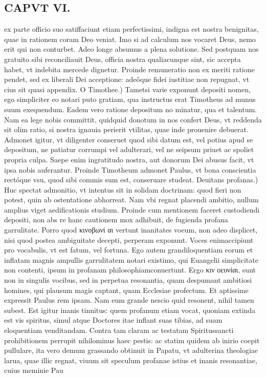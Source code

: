 \documentclass{article}
\begin{document}
\begin{pages}
\section*{CAPVT VI. }
\marginpar{[ p.85 ]}\pstart ex parte officio suo satiffaciunt etiam perfectissimi, indigna est nostra benignitas, quae in rationem coram Deo veniat. Imo si ad calculum nos vocaret Deus, nemo erit qui non conturbet. Adeo longe absumus a plena solutione. Sed postquam nos gratuito sibi reconciliauit Deus, officia nostra qualiacunque sint, sic accepta habet, vt indebita mercede dignetur. Proinde remuneratio non ex meriti ratione pendet, sed ex liberali Dei acceptione: adeôque fidei iustitiae non repugnat, vt cius sit quasi appendix.  \pend\pstart O Timothee.) Tametsi varie exponunt depositi nomen, ego simpliciter eo notari puto gratiam, qua instructus erat Timotheus ad munus suum exequendum. Eadem vero ratione depositum no minatur, qua et talentum. Nam ea lege nobis committit, quidquid donotum in nos confert Deus, vt reddenda sit olim ratio, si nostra ignauia perierit vtilitas, quae inde prouenire debuerat. Admonet igitur, vt diligenter conseruet quod sibi datum est, vel potius apud se depositum, ne patiatur corrumpi vel adulterari, vel ne seipsum priuet ac spoliet propria culpa. Saepe enim ingratitudo nostra, aut donorum Dei abusus facit, vt ipsa nobis auferantur. Proinde Timotheum admonet Paulus, vt bona conscientia rectóque vsu, quod sibi commis sum est, conseruare studeat.  \pend\pstart Deuitans profanas.) Huc spectat admonitio, vt intentus sit in solidam doctrinam: quod fieri non potest, quin ab ostentatione abhorreat. Nam vbi regnat placendi ambitio, nullum amplius viget aedificationis studium. Proinde cum mentionem faceret custodiendi depositi, non abs re hanc cautionem mox adhibuit, de fugienda profana garrulitate. Porro quod κινοβωνί αι vertunt inanitates voeum, non adeo displicet, nisi quod postea ambiguitate decepti, perperam exponunt. Voces enimaccipiunt pro vocabulis, vt est fatum, vel fortuna. Ego autem grandiloquentiam eorum et inflatam magnis ampullis garrulitatem notari existimo, qui Euangelii simplicitate non contenti, ipsum in profanam philosophiamconuertunt. Ergo κιν οευνίαι, sunt non in singulis vocibus, sed in perpetua resonantia, quam despumant ambitiosi homines, qui plausum magis captant, quam Ecclesiae profectum. Et aptissime expressit Paulus rem ipsam. Nam eum grande nescio quid resonent, nihil tamen subest. Est igitur inanis tinnitus: quem profanum etiam vocat, quoniam extinda est vis spiritus, simul atque Doctores itae inflant suas tibias, ad suam eloquentiam venditandam. Contra tam claram ac testatam Spiritussancti prohibitionem perrupit nihilominus haec pestis: ac statim quidem ab inirio coepit pullulare, ita vero demum grassando obtinuit in Papatu, vt adulterina theologiae larua, quae illic regnat, viuum sit speculum profanae istius et inanis resonantiae, cuius meminie Pau\pend

\end{pages}
\end{document}
